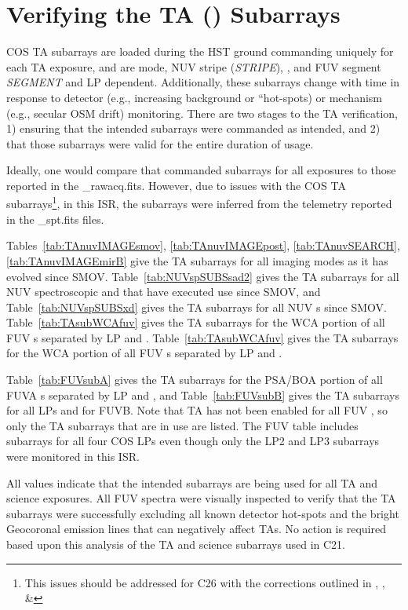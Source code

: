 \section{Verifying the TA (\tacq{}) Subarrays}\label{sec:subarray}

COS TA subarrays are loaded during the HST ground commanding uniquely for each TA exposure,
and are \tacq{} mode, NUV stripe (\textit{STRIPE}), \cenwave, and FUV segment \textit{SEGMENT} and LP dependent.
Additionally, these subarrays change with time in response to detector (e.g., increasing background or ``hot-spots)
or mechanism (e.g., secular OSM drift) monitoring.
There are two stages to the TA verification,
1) ensuring that the intended subarrays were commanded as intended, and
2) that those subarrays were valid for the entire duration of usage.

Ideally, one would compare that commanded subarrays for all exposures to those reported in the \textsf{\_rawacq.fits}.
However, due to issues with the COS TA subarrays\footnote{This issues should be addressed for C26 with the corrections outlined in , , \& },
in this ISR, the subarrays were inferred from the telemetry reported in the \textsf{\_spt.fits} files.

Tables~\ref{tab:TAnuvIMAGEsmov}, \ref{tab:TAnuvIMAGEpost}, \ref{tab:TAnuvSEARCH}, \ref{tab:TAnuvIMAGEmirB} give the TA subarrays for all imaging modes
as it has evolved since SMOV.
Table~\ref{tab:NUVspSUBSsad2} gives the TA subarrays for all NUV spectroscopic  and  that have executed use since SMOV, and
Table~\ref{tab:NUVspSUBSxd} gives the TA subarrays for all NUV s since SMOV.
Table~\ref{tab:TAsubWCAfuv} gives the TA subarrays for the WCA portion of all FUV s separated by LP and \cenwave.
Table~\ref{tab:TAsubWCAfuv} gives the TA subarrays for the WCA portion of all FUV s separated by LP and \cenwave.

Table~\ref{tab:FUVsubA} gives the TA subarrays for the PSA/BOA portion of all FUVA \tacq{}s separated by LP and \cenwave,
and Table~\ref{tab:FUVsubB} gives the TA subarrays for all LPs and \cenwaves for FUVB.
Note that TA has not been enabled for all FUV \cenwaves, so only the TA subarrays that are in use are listed.
The FUV table includes subarrays for all four COS LPs even though only the LP2 and LP3 subarrays were monitored in this ISR.

All values indicate that the intended subarrays are being used for all TA and science exposures. All FUV spectra were visually
inspected to verify that the TA subarrays were successfully excluding all known detector hot-spots and the
bright Geocoronal emission lines that can negatively affect TAs.  No action is required based upon this
analysis of the TA and science subarrays used in C21.

